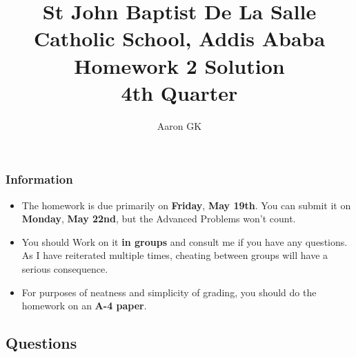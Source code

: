 \documentclass[11pt,addpoints]{exam}
\author{Aaron GK}
\begin{document}
	\title{St John Baptist De La Salle Catholic School, Addis Ababa\\
		\large Homework 2 Solution \\
		4th Quarter}
	\maketitle
	\begin{center}
		\subsubsection*{Information}
		\begin{itemize}
			\item The homework is due primarily on \textbf{Friday}, \textbf{May 19th}. You can submit it on \textbf{Monday}, \textbf{May 22nd}, but the Advanced Problems won't count.
			\item You should Work on it \textbf{in groups} and consult me if you have any questions. As I have reiterated multiple times, cheating between groups will have a serious consequence.
			\item For purposes of neatness and simplicity of grading, you should do the homework on an \textbf{A-4 paper}.
		\end{itemize}
	\end{center}
	\begin{center}
		\subsection*{Questions}
	\end{center}
	
\end{document}
